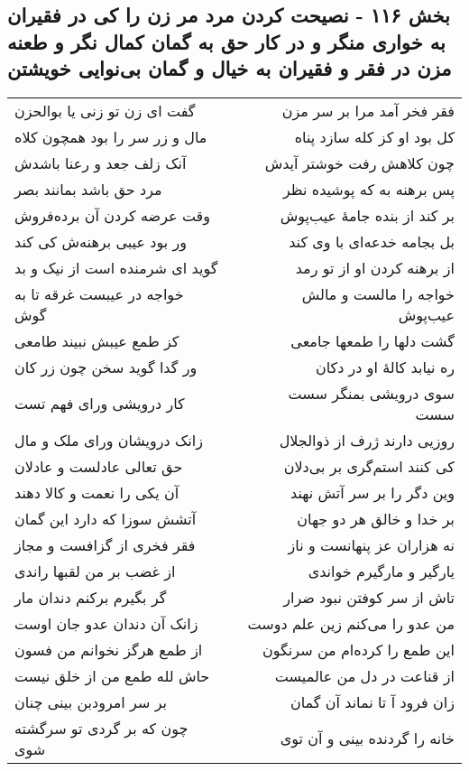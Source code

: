 \begin{center}
\section*{بخش ۱۱۶ - نصیحت کردن مرد مر زن را کی در فقیران به خواری منگر و در کار حق به گمان کمال نگر و طعنه مزن در فقر و فقیران به خیال و گمان بی‌نوایی خویشتن}
\label{sec:sh116}
\begin{longtable}{l p{0.5cm} r}
گفت ای زن تو زنی یا بوالحزن
&&
فقر فخر آمد مرا بر سر مزن
\\
مال و زر سر را بود همچون کلاه
&&
کل بود او کز کله سازد پناه
\\
آنک زلف جعد و رعنا باشدش
&&
چون کلاهش رفت خوشتر آیدش
\\
مرد حق باشد بمانند بصر
&&
پس برهنه به که پوشیده نظر
\\
وقت عرضه کردن آن برده‌فروش
&&
بر کند از بنده جامهٔ عیب‌پوش
\\
ور بود عیبی برهنه‌ش کی کند
&&
بل بجامه خدعه‌ای با وی کند
\\
گوید ای شرمنده است از نیک و بد
&&
از برهنه کردن او از تو رمد
\\
خواجه در عیبست غرقه تا به گوش
&&
خواجه را مالست و مالش عیب‌پوش
\\
کز طمع عیبش نبیند طامعی
&&
گشت دلها را طمعها جامعی
\\
ور گدا گوید سخن چون زر کان
&&
ره نیابد کالهٔ او در دکان
\\
کار درویشی ورای فهم تست
&&
سوی درویشی بمنگر سست سست
\\
زانک درویشان ورای ملک و مال
&&
روزیی دارند ژرف از ذوالجلال
\\
حق تعالی عادلست و عادلان
&&
کی کنند استم‌گری بر بی‌دلان
\\
آن یکی را نعمت و کالا دهند
&&
وین دگر را بر سر آتش نهند
\\
آتشش سوزا که دارد این گمان
&&
بر خدا و خالق هر دو جهان
\\
فقر فخری از گزافست و مجاز
&&
نه هزاران عز پنهانست و ناز
\\
از غضب بر من لقبها راندی
&&
یارگیر و مارگیرم خواندی
\\
گر بگیرم برکنم دندان مار
&&
تاش از سر کوفتن نبود ضرار
\\
زانک آن دندان عدو جان اوست
&&
من عدو را می‌کنم زین علم دوست
\\
از طمع هرگز نخوانم من فسون
&&
این طمع را کرده‌ام من سرنگون
\\
حاش لله طمع من از خلق نیست
&&
از قناعت در دل من عالمیست
\\
بر سر امرودبن بینی چنان
&&
زان فرود آ تا نماند آن گمان
\\
چون که بر گردی تو سرگشته شوی
&&
خانه را گردنده بینی و آن توی
\\
\end{longtable}
\end{center}
